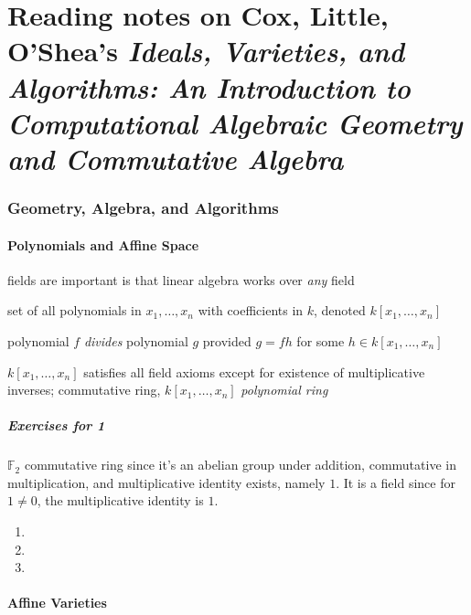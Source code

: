 \part{Reading notes on Cox, Little, O'Shea's \emph{Ideals, Varieties, and Algorithms: An Introduction to Computational Algebraic Geometry and Commutative Algebra}}


\section{Geometry, Algebra, and Algorithms}

\subsection{Polynomials and Affine Space}

fields are important is that linear algebra works over \emph{any} field

\begin{definition}[2] set of all polynomials in $x_1 , \dots , x_n$ with coefficients in $k$, denoted $k[x_1, \dots , x_n]$

\end{definition}

polynomial $f$ \emph{divides} polynomial $g$ provided $g= fh$ for some $h \in k[x_1, \dots , x_n ]$

$k[x_1, \dots, x_n]$ satisfies all field axioms except for existence of multiplicative inverses; commutative ring, $k[x_1, \dots , x_n]$ \emph{polynomial ring}


\subsubsection*{Exercises for 1}

$\mathbb{F}_2$ commutative ring since it's an abelian group under addition, commutative in multiplication, and multiplicative identity exists, namely $1$.  It is a field since for $1\neq 0$, the multiplicative identity is $1$.  

\begin{enumerate}
\item[(a)]
\item[(b)]
\item[(c)]
\end{enumerate}




\subsection{Affine Varieties }



